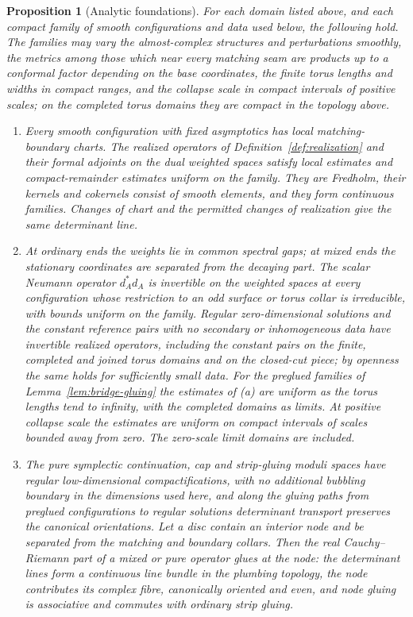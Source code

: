 \documentclass[11pt]{amsart}
\newtheorem{proposition}[theorem]{Proposition}
\theoremstyle{definition}
\theoremstyle{remark}
\theoremstyle{plain}
\numberwithin{equation}{section}
\begin{document}
\begin{proposition}[Analytic foundations]\label{prop:foundations}
For each domain listed above, and each compact family of smooth
configurations and data used below, the following hold. The families
may vary the almost-complex structures and perturbations smoothly, the
metrics among those which near every matching seam are products up to
a conformal factor depending on the base coordinates, the finite torus
lengths and widths in compact ranges, and the collapse scale in compact
intervals of positive scales; on the completed torus domains they are
compact in the topology above.
\begin{enumerate}[label=(\alph*)]
\item Every smooth configuration with fixed asymptotics has local
matching-boundary charts. The realized operators of
Definition~\ref{def:realization} and their formal adjoints on the dual
weighted spaces satisfy local estimates and compact-remainder
estimates uniform on the family. They are Fredholm, their kernels and
cokernels consist of smooth elements, and they form continuous
families. Changes of chart and the permitted changes of realization
give the same determinant line.
\item At ordinary ends the weights lie in common spectral gaps; at
mixed ends the stationary coordinates are separated from the decaying
part. The scalar Neumann operator $d_A^*d_A$ is invertible on the
weighted spaces at every configuration whose restriction to an odd
surface or torus collar is irreducible, with bounds uniform on the
family. Regular zero-dimensional solutions and the constant reference
pairs with no secondary or inhomogeneous data have invertible realized
operators, including the constant pairs on the finite, completed and
joined torus domains and on the closed-cut piece; by openness the same
holds for sufficiently small data. For the preglued families of
Lemma~\ref{lem:bridge-gluing} the estimates of (a) are uniform as the
torus lengths tend to infinity, with the completed domains as limits.
At positive collapse scale the estimates are uniform on compact intervals of scales bounded away
from zero. The zero-scale limit domains are included.
\item The pure symplectic continuation, cap
and strip-gluing moduli spaces have regular low-dimensional
compactifications, with no additional bubbling boundary in the
dimensions used here, and along the gluing paths from preglued
configurations to regular solutions determinant transport preserves
the canonical orientations. Let a disc contain an interior node and be
separated from the matching and boundary collars. Then the real
Cauchy--Riemann part of a mixed or pure operator glues at the node:
the determinant lines form a continuous line bundle in the plumbing
topology, the node contributes its complex fibre, canonically oriented
and even, and node gluing is associative and commutes with ordinary
strip gluing.
\end{enumerate}
\end{proposition}
\end{document}

